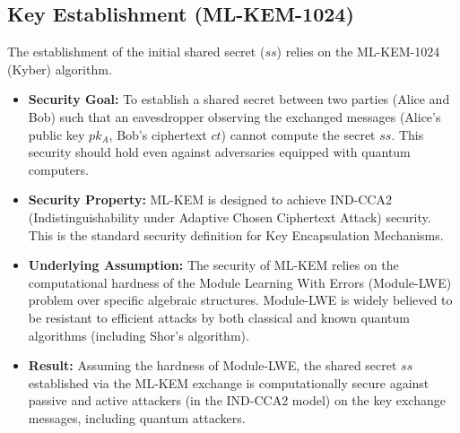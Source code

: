 \documentclass[11pt]{article}
\begin{document}
	\subsection{Key Establishment (ML-KEM-1024)}
	The establishment of the initial shared secret ($ss$) relies on the ML-KEM-1024 (Kyber) algorithm.
	\begin{itemize}
		\item \textbf{Security Goal:} To establish a shared secret between two parties (Alice and Bob) such that an eavesdropper observing the exchanged messages (Alice's public key $pk_A$, Bob's ciphertext $ct$) cannot compute the secret $ss$. This security should hold even against adversaries equipped with quantum computers.
		\item \textbf{Security Property:} ML-KEM is designed to achieve IND-CCA2 (Indistinguishability under Adaptive Chosen Ciphertext Attack) security. This is the standard security definition for Key Encapsulation Mechanisms.
		\item \textbf{Underlying Assumption:} The security of ML-KEM relies on the computational hardness of the Module Learning With Errors (Module-LWE) problem over specific algebraic structures. Module-LWE is widely believed to be resistant to efficient attacks by both classical and known quantum algorithms (including Shor's algorithm).
		\item \textbf{Result:} Assuming the hardness of Module-LWE, the shared secret $ss$ established via the ML-KEM exchange is computationally secure against passive and active attackers (in the IND-CCA2 model) on the key exchange messages, including quantum attackers.
	\end{itemize}
	
\end{document}
